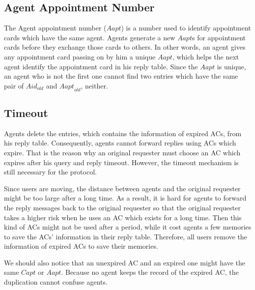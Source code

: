 \subsection{ Agent Appointment Number}

\noindent The Agent appointment number ($Aapt$) is a number used to identify appointment cards which have the same agent. Agents generate a new $Aapt$s for appointment cards before they exchange those cards to others. In other words, an agent gives any appointment card passing on by him a unique $Aapt$, which helps the next agent identify the appointment card in his reply table. Since the $Aapt$ is unique, an agent who is not the first one cannot find two entries which have the same pair of ${Aid}_{old}$ and ${Aapt}_{old}$, neither.


\subsection{ Timeout}

\noindent Agents delete the entries, which contains the information of expired ACs, from his reply table. Consequently, agents cannot forward replies using ACs which expire. That is the reason why an original requester must choose an AC which expires after his query and reply timeout. However, the timeout mechanism is still necessary for the protocol.

Since users are moving, the distance between agents and the original requester might be too large after a long time. As a result, it is hard for agents to forward the reply messages back to the original requester so that the original requester takes a higher risk when he uses an AC which exists for a long time. Then this kind of ACs might not be used after a period, while it cost agents a few memories to save the ACs' information in their reply table. Therefore, all users remove the information of expired ACs to save their memories.

We should also notice that an unexpired AC and an expired one might have the same $Capt$ or $Aapt$. Because no agent keeps the record of the expired AC, the duplication cannot confuse agents.




































